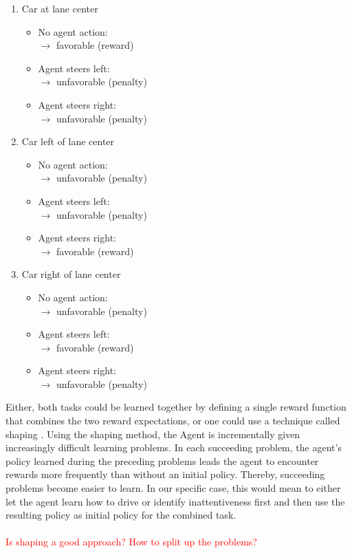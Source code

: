 \begin{enumerate}[noitemsep]
    \item Car at lane center
    \begin{itemize}[noitemsep]
        \item No agent action: \\$\rightarrow$ favorable (reward)
        \item Agent steers left: \\$\rightarrow$ unfavorable (penalty)
        \item Agent steers right: \\$\rightarrow$ unfavorable (penalty)
    \end{itemize}
    \item Car left of lane center 
    \begin{itemize}[noitemsep]
        \item No agent action: \\$\rightarrow$ unfavorable (penalty)
        \item Agent steers left: \\$\rightarrow$ unfavorable (penalty)
        \item Agent steers right: \\$\rightarrow$ favorable (reward)
    \end{itemize}
    \item Car right of lane center
    \begin{itemize}[noitemsep]
        \item No agent action: \\$\rightarrow$ unfavorable (penalty)
        \item Agent steers left: \\$\rightarrow$ favorable (reward)
        \item Agent steers right: \\$\rightarrow$ unfavorable (penalty)
    \end{itemize}
\end{enumerate}

Either, both tasks could be learned together by defining a single reward function that combines the two reward expectations, or one could use a technique called shaping \parencite{RL_introductio}. Using the shaping method, the Agent is incrementally given increasingly difficult learning problems. In each succeeding problem, the agent's policy learned during the preceding problems leads the agent to encounter rewards more frequently than without an initial policy. Thereby, succeeding problems become easier to learn. In our specific case, this would mean to either let the agent learn how to drive or identify inattentiveness first and then use the resulting policy as initial policy for the combined task.\\
\\
\textcolor{red}{Is shaping a good approach? How to split up the problems?}


